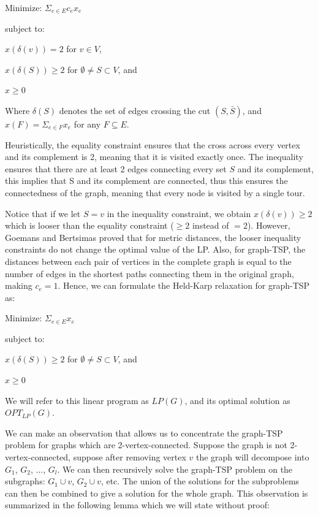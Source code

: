 \documentclass[12pt]{article}
\begin{document}
Minimize: $\Sigma_{e\in E}c_e x_e$

subject to:

$x(\delta(v))=2$ for $v\in V$,

$x(\delta(S)) \geq 2$ for $\emptyset \not= S \subset V$, and

$x \geq 0$

Where $\delta(S)$ denotes the set of edges crossing the cut $(S,\bar{S})$, and $x(F)=\Sigma_{e\in F} x_e$ for any $F \subseteq E$.

Heuristically, the equality constraint ensures that the cross across every vertex and its complement is 2, meaning that it is visited exactly once. The inequality ensures that there are at least 2 edges connecting every set $S$ and its complement, this implies that S and its complement are connected, thus this ensures the connectedness of the graph, meaning that every node is visited by a single tour.

Notice that if we let $S = v$ in the inequality constraint, we obtain $x(\delta(v)) \geq 2$ which is looser than the equality constraint ($\geq 2$ instead of $= 2$). However, Goemans and Bertsimas proved that for metric distances, the looser inequality constraints do not change the optimal value of the LP. Also, for graph-TSP, the distances between each pair of vertices in the complete graph is equal to the number of edges in the shortest paths connecting them in the original graph, making $c_e = 1$. Hence, we can formulate the Held-Karp relaxation for graph-TSP as:

Minimize: $\Sigma_{e \in E} x_e$

subject to:

$x(\delta(S)) \geq 2$ for $\emptyset \not= S \subset V$, and

$x \geq 0$

We will refer to this linear program as $LP(G)$, and its optimal solution as $OPT_{LP}(G)$.

We can make an observation that allows us to concentrate the graph-TSP problem for graphs which are 2-vertex-connected. Suppose the graph is not 2-vertex-connected, suppose after removing vertex $v$ the graph will decompose into $G_1$, $G_2$, $\ldots$, $G_l$. We can then recursively solve the graph-TSP problem on the subgraphs: $G_1 \cup {v}$, $G_2 \cup {v}$, etc. The union of the solutions for the subproblems can then be combined to give a solution for the whole graph. This observation is summarized in the following lemma which we will state without proof:
\end{document}
